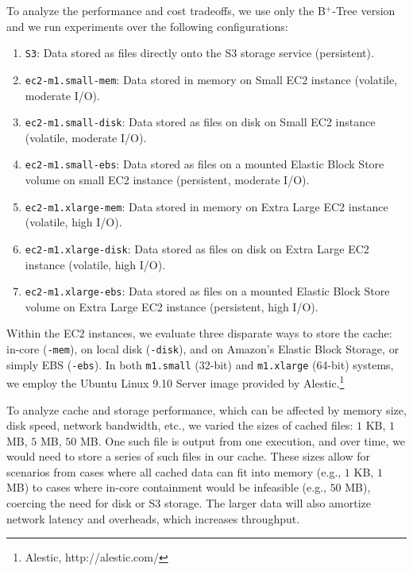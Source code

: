 
To analyze the performance and cost tradeoffs, we use only the B$^+$-Tree
version and we run experiments over the following configurations:
\begin{enumerate}
\item {\tt S3}: Data stored as files directly onto the S3
storage service (persistent).
\item {\tt ec2-m1.small-mem}: Data stored in memory on Small EC2 instance
(volatile, moderate I/O).
\item {\tt ec2-m1.small-disk}: Data stored as files on disk on Small EC2
instance (volatile, moderate I/O).
\item {\tt ec2-m1.small-ebs}: Data stored as files on a mounted Elastic Block
Store volume on small EC2 instance (persistent, moderate I/O).
\item {\tt ec2-m1.xlarge-mem}: Data stored in memory on Extra Large EC2 instance
(volatile, high I/O). 
\item {\tt ec2-m1.xlarge-disk}: Data stored as files on disk on Extra Large EC2
instance (volatile, high I/O).
\item {\tt ec2-m1.xlarge-ebs}: Data stored as files on a mounted Elastic Block
Store volume on Extra Large EC2 instance (persistent, high I/O).
\end{enumerate}

Within the EC2 instances, we evaluate three disparate ways to store the cache:
in-core ({\tt *-mem}), on local disk ({\tt *-disk}), and on Amazon's Elastic
Block Storage, or simply EBS ({\tt *-ebs}). In both {\tt m1.small} (32-bit)
and {\tt m1.xlarge} (64-bit) systems, we employ the Ubuntu Linux 9.10 Server
image provided by Alestic.\footnote{Alestic, http://alestic.com/}

To analyze cache and storage performance, which can be affected by
memory size, disk speed, network bandwidth, etc., we varied the
sizes of cached files: $1$ KB, $1$ MB, $5$ MB, $50$ MB\@. One such file is output
from one execution, and over time, we would need to store a series of such
files in our cache. These sizes allow for scenarios from cases where all cached
data can fit into memory (e.g., $1$ KB, $1$ MB) to cases where in-core
containment would be infeasible (e.g., $50$ MB), coercing the need for disk or
S3 storage. The larger data will also amortize network latency and
overheads, which increases throughput. 

